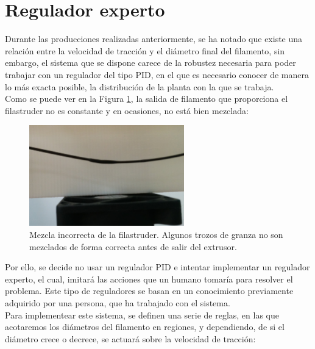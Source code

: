 \section{Regulador experto}
\label{sec:reg_expt}

Durante las producciones realizadas anteriormente, se ha notado que existe una relación entre la velocidad de tracción y el diámetro final del filamento, sin embargo, el sistema que se dispone carece de la robustez necesaria para poder trabajar con un regulador del tipo PID, en el que es necesario conocer de manera lo más exacta posible, la distribución de la planta con la que se trabaja.\\

Como se puede ver en la Figura \ref{fig:reg_mezcla}, la salida de filamento que proporciona el filastruder no es constante y en ocasiones, no está bien mezclada:

\begin{figure}[H]
    \centering
    \includegraphics[width=0.6\textwidth]{images/producciones/22072015/IMG_20150722_120959.jpg}
    \caption[Mezcla incorrecta de la filastruder.]{Mezcla incorrecta de la filastruder. Algunos trozos de granza no son mezclados de forma correcta antes de salir del extrusor.}
    \label{fig:reg_mezcla}
\end{figure}

Por ello, se decide no usar un regulador PID e intentar implementar un regulador experto, el cual, imitará las acciones que un humano tomaría para resolver el problema. Este tipo de reguladores se basan en un conocimiento previamente adquirido por una persona, que ha trabajado con el sistema.\\

Para implementear este sistema, se definen una serie de reglas, en las que acotaremos los diámetros del filamento en regiones, y dependiendo, de si el diámetro crece o decrece, se actuará sobre la velocidad de tracción:

